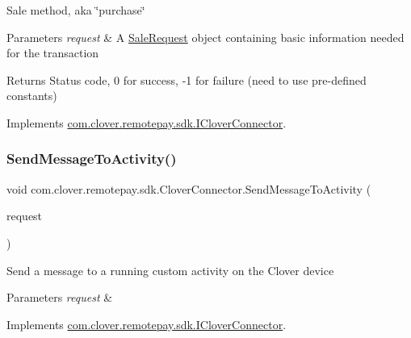 Sale method, aka \char`\"{}purchase\char`\"{} 


\begin{DoxyParams}{Parameters}
{\em request} & A \hyperlink{classcom_1_1clover_1_1remotepay_1_1sdk_1_1_sale_request}{Sale\+Request} object containing basic information needed for the transaction\\
\hline
\end{DoxyParams}
\begin{DoxyReturn}{Returns}
Status code, 0 for success, -\/1 for failure (need to use pre-\/defined constants)
\end{DoxyReturn}


Implements \hyperlink{interfacecom_1_1clover_1_1remotepay_1_1sdk_1_1_i_clover_connector_acc92394e6902137c559510e498e78529}{com.\+clover.\+remotepay.\+sdk.\+I\+Clover\+Connector}.

\mbox{\label{classcom_1_1clover_1_1remotepay_1_1sdk_1_1_clover_connector_a328a0dd8b4ed02567f7e8d3184f35038}} 
\subsubsection{\texorpdfstring{Send\+Message\+To\+Activity()}{SendMessageToActivity()}}
{\footnotesize\ttfamily void com.\+clover.\+remotepay.\+sdk.\+Clover\+Connector.\+Send\+Message\+To\+Activity (\begin{DoxyParamCaption}\item[{\hyperlink{classcom_1_1clover_1_1remotepay_1_1sdk_1_1_message_to_activity}{Message\+To\+Activity}}]{request }\end{DoxyParamCaption})}



Send a message to a running custom activity on the Clover device 


\begin{DoxyParams}{Parameters}
{\em request} & \\
\hline
\end{DoxyParams}


Implements \hyperlink{interfacecom_1_1clover_1_1remotepay_1_1sdk_1_1_i_clover_connector_ad6e241f6dac22bafa5edcc89457c99a7}{com.\+clover.\+remotepay.\+sdk.\+I\+Clover\+Connector}.

